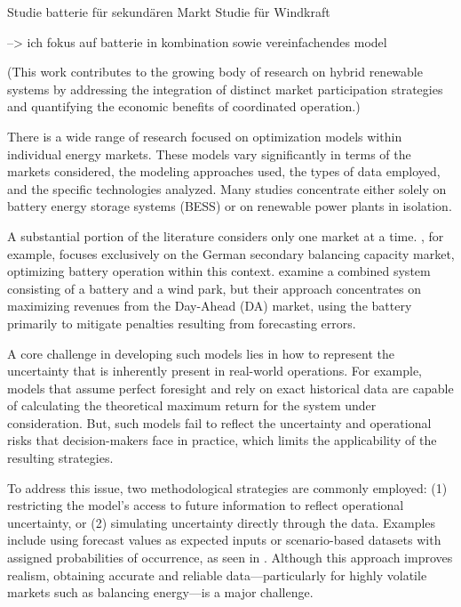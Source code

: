 Studie batterie für sekundären Markt
Studie für Windkraft

--> ich fokus auf batterie in kombination sowie vereinfachendes model

(This work contributes to the growing body of research on hybrid renewable systems by addressing the
integration of distinct market participation strategies and quantifying the economic benefits of coordinated operation.)


There is a wide range of research focused on optimization models within individual energy markets.
These models vary significantly in terms of the markets considered, the modeling approaches used,
the types of data employed, and the specific technologies analyzed.
Many studies concentrate either solely on battery energy storage systems (BESS) or
on renewable power plants in isolation.

A substantial portion of the literature considers only one market at a time.
\cite{Olk.2019}, for example, focuses exclusively on the German secondary balancing capacity market,
optimizing battery operation within this context.
\cite{Cai.2016} examine a combined system consisting of a battery and a wind park,
but their approach concentrates on maximizing revenues from the Day-Ahead (DA) market,
using the battery primarily to mitigate penalties resulting from forecasting errors.

A core challenge in developing such models lies in how to represent the uncertainty
that is inherently present in real-world operations. For example, models that assume perfect
foresight and rely on exact historical data
are capable of calculating the theoretical maximum return for the system under consideration.
But, such models fail to reflect the uncertainty and operational risks
that decision-makers face in practice, which limits the applicability of the resulting strategies.

To address this issue, two methodological strategies are commonly employed:
(1) restricting the model's access to future information to reflect operational uncertainty,
or (2) simulating uncertainty directly through the data.
Examples include using forecast values as expected inputs or
scenario-based datasets with assigned probabilities of occurrence, as seen in \cite{Krishnamurthy.2018}.
Although this approach improves realism, obtaining accurate and reliable data—particularly for highly volatile
markets such as balancing energy—is a major challenge.


